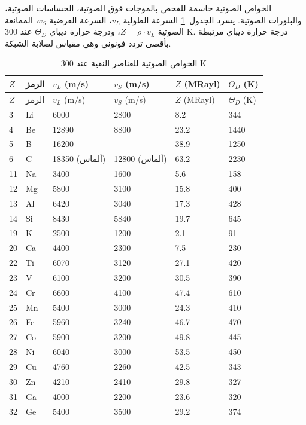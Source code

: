\documentclass[11pt,a4paper]{article}
\begin{document}
\begin{otherlanguage}{arabic}
		الخواص الصوتية حاسمة للفحص بالموجات فوق الصوتية، الحساسات الصوتية، والبلورات الصوتية. يسرد الجدول~\ref{tab:acoustic-properties-func} السرعة الطولية \(v_L\)، السرعة العرضية \(v_S\)، الممانعة الصوتية \(Z = \rho \cdot v_L\)، ودرجة حرارة ديباي \(\Theta_D\) عند 300 K. درجة حرارة ديباي مرتبطة بأقصى تردد فونوني وهي مقياس لصلابة الشبكة.
		
		\begin{longtable}{p{0.8cm}p{1.2cm}p{2.2cm}p{2.2cm}p{2.2cm}p{2.2cm}}
			\caption{الخواص الصوتية للعناصر النقية عند 300 K} \label{tab:acoustic-properties-func} \\
			\toprule
			\(Z\) & الرمز & \(v_L\) (m/s) & \(v_S\) (m/s) & \(Z\) (MRayl) & \(\Theta_D\) (K) \\
			\midrule
			\endfirsthead
			\toprule
			\(Z\) & الرمز & \(v_L\) (m/s) & \(v_S\) (m/s) & \(Z\) (MRayl) & \(\Theta_D\) (K) \\
			\midrule
			\endhead
			3  & Li & 6000 & 2800 & 8.2 & 344 \\
			4  & Be & 12890 & 8800 & 23.2 & 1440 \\
			5  & B  & 16200 & --- & 38.9 & 1250 \\
			6  & C  & 18350 (ألماس) & 12800 (ألماس) & 63.2 & 2230 \\
			11 & Na & 3400 & 1600 & 5.6 & 158 \\
			12 & Mg & 5800 & 3100 & 15.8 & 400 \\
			13 & Al & 6420 & 3040 & 17.3 & 428 \\
			14 & Si & 8430 & 5840 & 19.7 & 645 \\
			19 & K  & 2500 & 1200 & 2.1 & 91 \\
			20 & Ca & 4400 & 2300 & 7.5 & 230 \\
			22 & Ti & 6070 & 3120 & 27.1 & 420 \\
			23 & V  & 6100 & 3200 & 30.5 & 390 \\
			24 & Cr & 6600 & 4100 & 47.4 & 610 \\
			25 & Mn & 5400 & 3000 & 24.3 & 410 \\
			26 & Fe & 5960 & 3240 & 46.7 & 470 \\
			27 & Co & 5900 & 3200 & 49.8 & 445 \\
			28 & Ni & 6040 & 3000 & 53.5 & 450 \\
			29 & Cu & 4760 & 2260 & 42.5 & 343 \\
			30 & Zn & 4210 & 2410 & 29.8 & 327 \\
			31 & Ga & 4000 & 2200 & 23.6 & 320 \\
			32 & Ge & 5400 & 3500 & 29.2 & 374 \\

\end{longtable}
\end{otherlanguage}
\end{document}
